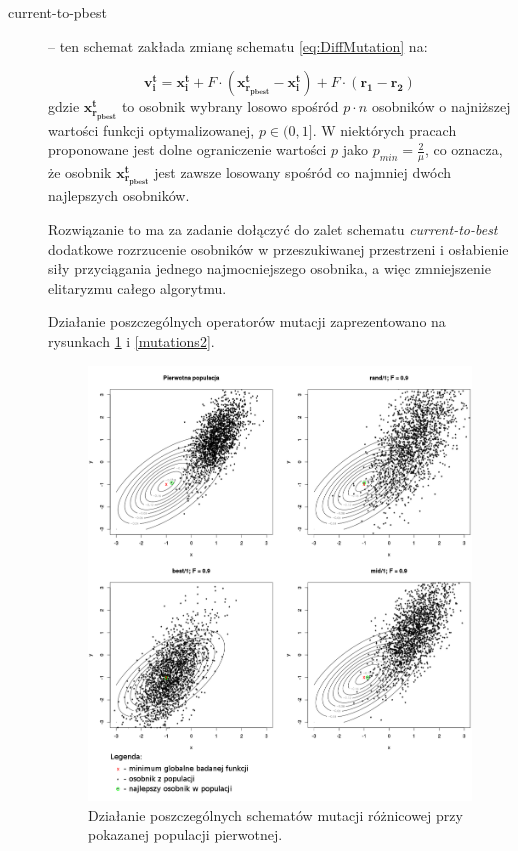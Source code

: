 \documentclass[12pt,a4paper]{report}
\begin{document}
{{{{\begin{description}
\item[current-to-pbest] \cite{JADE} -- ten schemat zakłada zmianę schematu \ref{eq:DiffMutation} na:

\begin{equation}
\mathbf{v_i^{t}} = \mathbf{x_i^t} + F \cdot (\mathbf{x_{r_{pbest}}^t} - \mathbf{x_i^t}) + F \cdot (\mathbf{r_1} - \mathbf{r_{2}})
\end{equation}
gdzie $\mathbf{x_{r_{pbest}}^t}$ to osobnik wybrany losowo spośród $p \cdot n$ osobników o najniższej wartości funkcji optymalizowanej, $p \in (0,1]$. W niektórych pracach \cite{SHADE} proponowane jest dolne ograniczenie wartości $p$ jako $p_{min} = \frac{2}{\mu}$, co oznacza, że osobnik $\mathbf{x_{r_{pbest}}^t}$ jest zawsze losowany spośród co najmniej dwóch najlepszych osobników.

Rozwiązanie to ma za zadanie dołączyć do zalet schematu \emph{current-to-best} dodatkowe rozrzucenie osobników w przeszukiwanej przestrzeni i osłabienie siły przyciągania jednego najmocniejszego osobnika, a więc zmniejszenie elitaryzmu całego algorytmu.


\par{
Działanie poszczególnych operatorów mutacji zaprezentowano na rysunkach \ref{mutations1} i \ref{mutations2}.
}


\begin{figure}[h]
\begin{center}\includegraphics[scale=0.375]{img/mutations1.png}\end{center}
\caption{Działanie poszczególnych schematów mutacji różnicowej przy pokazanej populacji pierwotnej.}
\label{mutations1}
\end{figure}


\end{description}}}}}
\end{document}

